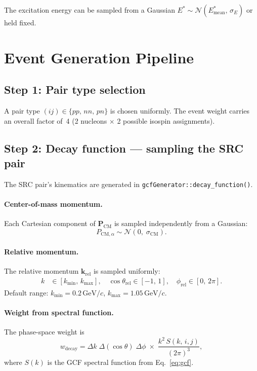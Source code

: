 \documentclass[11pt,a4paper]{article}
\newcommand{\vect}[1]{\bm{#1}}
\newcommand{\unit}[1]{\,\mathrm{#1}}
\newcommand{\GeV}{\unit{GeV}}
\begin{document}
The excitation energy can be sampled from a Gaussian
$E^{*} \sim \mathcal{N}(E^{*}_{\text{mean}},\,\sigma_{E})$
or held fixed.

\section{Event Generation Pipeline}

\subsection{Step 1: Pair type selection}

A pair type $(ij) \in \{pp,\,nn,\,pn\}$ is chosen uniformly.
The event weight carries an overall factor of~4 (2 nucleons $\times$ 2
possible isospin assignments).

\subsection{Step 2: Decay function --- sampling the SRC pair}
\label{sec:decay}

The SRC pair's kinematics are generated in \texttt{gcfGenerator::decay\_function()}.

\paragraph{Center-of-mass momentum.}
Each Cartesian component of $\vect{P}_{\text{CM}}$ is sampled independently
from a Gaussian:
\begin{equation}
  P_{\text{CM},\alpha} \sim \mathcal{N}(0,\;\sigma_{\text{CM}}).
\end{equation}

\paragraph{Relative momentum.}
The relative momentum $\vect{k}_{\text{rel}}$ is sampled uniformly:
\begin{align}
  k &\in [k_{\min},\,k_{\max}], \quad
  \cos\theta_{\text{rel}} \in [-1,\,1], \quad
  \phi_{\text{rel}} \in [0,\,2\pi].
\end{align}
Default range: $k_{\min} = 0.2\GeV/c$, $k_{\max} = 1.05\GeV/c$.

\paragraph{Weight from spectral function.}
The phase-space weight is
\begin{equation}\label{eq:decay_wt}
  w_{\text{decay}}
  = \Delta k\;\Delta(\cos\theta)\;\Delta\phi
    \;\times\;
    \frac{k^{2}\,S(k,\,i,j)}{(2\pi)^{3}},
\end{equation}
where $S(k)$ is the GCF spectral function from Eq.~\eqref{eq:gcf}.
\end{document}
